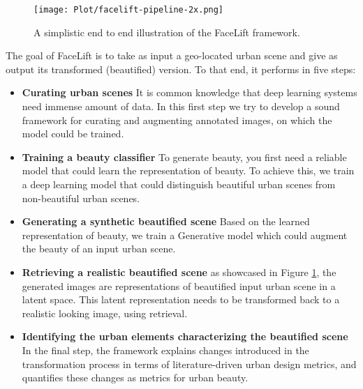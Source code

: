  \begin{figure}[ht]
	\centering
	\texttt{[image: Plot/facelift-pipeline-2x.png]}
	\caption{A simplistic end to end illustration of the FaceLift framework.}
	\label{fig:framework}
\end{figure}

The goal of FaceLift is to take as input a geo-located urban scene and give as output its transformed (beautified) version. 
To that end, it performs in five steps: 
\begin{itemize}
	\item \textbf{Curating urban scenes} It is common knowledge that deep learning systems need immense amount of data. In this first step we try to develop a sound framework for curating and augmenting annotated images, on which the model could be trained.
	\item \textbf{ Training a beauty classifier} To generate beauty, you first need a reliable model that could learn the representation of beauty. To achieve this, we train a deep learning model that could distinguish beautiful urban scenes from non-beautiful urban scenes. 
	\item \textbf{Generating a synthetic beautified scene} Based on the learned representation of beauty, we train a Generative model which could augment the beauty of an input urban scene. 
	\item \textbf{Retrieving a realistic beautified scene} as showcased in Figure \ref{fig:framework}, the generated images are representations of beautified input urban scene in a latent space. This latent representation needs to be transformed back to a realistic looking image, using retrieval.
	\item \textbf{Identifying the urban elements characterizing the beautified scene} In the final step, the framework explains changes introduced in the transformation process in terms of literature-driven urban design metrics, and quantifies these changes as metrics for urban beauty.
\end{itemize}


